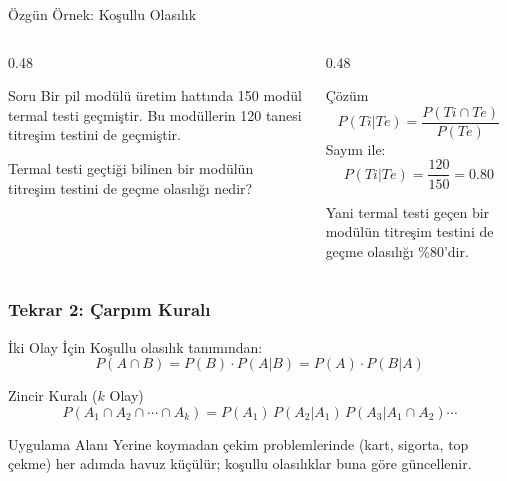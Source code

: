 \documentclass[light]{lutbeamer}
\begin{document}
\begin{frame}{Özgün Örnek: Koşullu Olasılık}
\small
\begin{columns}[T,onlytextwidth]
    \begin{column}{0.48\textwidth}
        \begin{block}{Soru}
            Bir pil modülü üretim hattında 150 modül termal testi geçmiştir. Bu modüllerin 120 tanesi titreşim testini de geçmiştir.

            \vspace{0.15cm}
            Termal testi geçtiği bilinen bir modülün titreşim testini de geçme olasılığı nedir?
        \end{block}
    \end{column}
    \begin{column}{0.48\textwidth}
        \begin{exampleblock}{Çözüm}
            \[
            P(Ti|Te)=\frac{P(Ti \cap Te)}{P(Te)}
            \]
            Sayım ile:
            \[
            P(Ti|Te)=\frac{120}{150}=0.80
            \]

            Yani termal testi geçen bir modülün titreşim testini de geçme olasılığı \%80'dir.
        \end{exampleblock}
    \end{column}
\end{columns}
\end{frame}

\begin{frame}[fragile]
    \frametitle{Tekrar 2: Çarpım Kuralı}
    \begin{block}{İki Olay İçin}
        Koşullu olasılık tanımından:
        \[
        P(A \cap B) = P(B) \cdot P(A|B) = P(A) \cdot P(B|A)
        \]
    \end{block}

    \begin{block}{Zincir Kuralı ($k$ Olay)}
        \[
        P(A_1 \cap A_2 \cap \cdots \cap A_k)
        = P(A_1)\, P(A_2|A_1)\, P(A_3|A_1 \cap A_2) \cdots
        \]
    \end{block}

    \begin{exampleblock}{Uygulama Alanı}
        Yerine koymadan çekim problemlerinde (kart, sigorta, top çekme) her adımda havuz küçülür; koşullu olasılıklar buna göre güncellenir.
    \end{exampleblock}
\end{frame}
\end{document}
